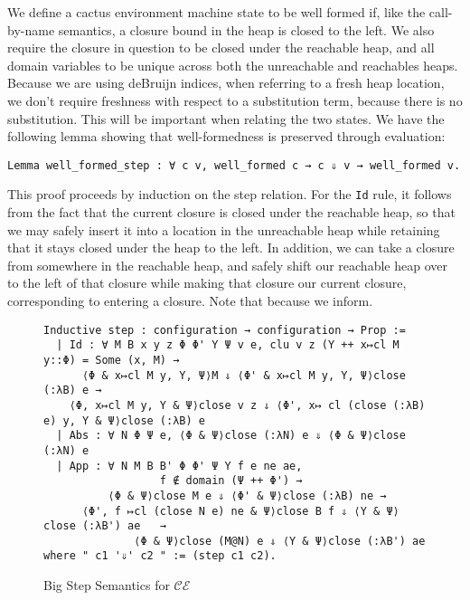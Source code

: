 We define a cactus environment machine state to be well formed if, like the
call-by-name semantics, a closure bound in the heap is closed to the left.
We also require the closure in question to be closed under the reachable heap,
and all domain variables to be unique across both the unreachable and reachables
heaps. Because we are using deBruijn indices, when referring to a fresh heap
location, we don't require freshness with respect to a substitution term,
because there is no substitution. This will be important when relating the two
states. We have the following lemma showing that well-formedness is preserved
through evaluation: 

\begin{lstlisting}
Lemma well_formed_step : ∀ c v, well_formed c → c ⇓ v → well_formed v.
\end{lstlisting}

This proof proceeds by induction on the step relation. For the \texttt{Id} rule,
it follows from the fact that the current closure is closed under the reachable
heap, so that we may safely insert it into a location in the unreachable heap
while retaining that it stays closed under the heap to the left. In addition, we
can take a closure from somewhere in the reachable heap, and safely shift our
reachable heap over to the left of that closure while making that closure our
current closure, corresponding to entering a closure. Note that because we
inform.     

\begin{figure}
\begin{lstlisting}
Inductive step : configuration → configuration → Prop :=
  | Id : ∀ M B x y z Φ Φ' Υ Ψ v e, clu v z (Υ ++ x↦cl M y::Φ) = Some (x, M) → 
      ⟨Φ & x↦cl M y, Υ, Ψ⟩M ⇓ ⟨Φ' & x↦cl M y, Υ, Ψ⟩close (:λB) e →
    ⟨Φ, x↦cl M y, Υ & Ψ⟩close v z ⇓ ⟨Φ', x↦ cl (close (:λB) e) y, Υ & Ψ⟩close (:λB) e
  | Abs : ∀ N Φ Ψ e, ⟨Φ & Ψ⟩close (:λN) e ⇓ ⟨Φ & Ψ⟩close (:λN) e
  | App : ∀ N M B B' Φ Φ' Ψ Υ f e ne ae, 
                  f ∉ domain (Ψ ++ Φ') → 
          ⟨Φ & Ψ⟩close M e ⇓ ⟨Φ' & Ψ⟩close (:λB) ne → 
      ⟨Φ', f ↦cl (close N e) ne & Ψ⟩close B f ⇓ ⟨Υ & Ψ⟩close (:λB') ae   →
              ⟨Φ & Ψ⟩close (M@N) e ⇓ ⟨Υ & Ψ⟩close (:λB') ae
where " c1 '⇓' c2 " := (step c1 c2).
\end{lstlisting}
\caption{Big Step Semantics for $\mathcal{CE}$}
\label{fig:bigstepcem}
\end{figure}


